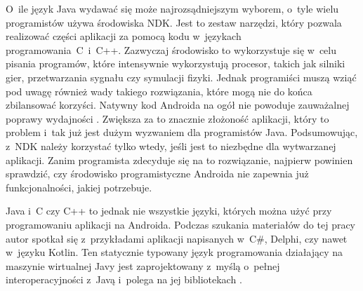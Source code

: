 O~ile język Java wydawać się może najrozsądniejszym wyborem, o~tyle wielu programistów używa środowiska NDK. Jest to zestaw narzędzi, który pozwala realizować części aplikacji za pomocą kodu w~językach programowania~C~i~C++. Zazwyczaj środowisko to wykorzystuje się w~celu pisania programów, które intensywnie wykorzystują procesor, takich jak silniki gier, przetwarzania sygnału czy symulacji fizyki. Jednak programiści muszą wziąć pod uwagę również wady takiego rozwiązania, które mogą nie do końca zbilansować korzyści. Natywny kod Androida na ogół nie powoduje zauważalnej poprawy wydajności \cite{website:java:wydajnosc}. Zwiększa za to znacznie złożoność aplikacji, który to problem i~tak już jest dużym wyzwaniem dla programistów Java. Podsumowując, z~NDK należy korzystać tylko wtedy, jeśli jest to niezbędne dla wytwarzanej aplikacji. Zanim programista zdecyduje się na to rozwiązanie, najpierw powinien sprawdzić, czy środowisko programistyczne Androida nie zapewnia już funkcjonalności, jakiej potrzebuje.

Java i~C czy C++ to jednak nie wszystkie języki, których można użyć przy programowaniu aplikacji na Androida. Podczas szukania materiałów do tej pracy autor spotkał się z~przykładami aplikacji napisanych w~C\#, Delphi, czy nawet w~języku Kotlin. Ten statycznie typowany język programowania działający na maszynie wirtualnej Javy jest zaprojektowany z~myślą o~pełnej interoperacyjności z~Javą i~polega na jej bibliotekach \cite{website:wikipedia}. %





